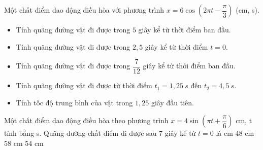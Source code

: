   \begin{vidu}
  	Một chất điểm dao động điều hòa với phương trình $x = 6\cos\left(2\pi t - \dfrac{\pi}{3}\right)$ (cm, s). 	
  	\begin{itemize}
  		\item[1.] Tính quãng đường vật đi được trong $5$ giây kể từ thời điểm ban đầu.
  		\item[2.] Tính quãng đường vật đi được trong $2,5$ giây kể từ thời điểm $t = 0$.
  		\item[3.] Tính quãng đường vật đi được trong $\dfrac{7}{12}$ giây kể từ thời điểm ban đầu.
  		\item[4.] Tính quãng đường vật đi được từ thời điểm $t_1 = 1,25\ s$ đến $t_2 = 4,5\ s$.
  		\item[5.] Tính tốc độ trung bình của vật trong $1,25$ giây đầu tiên.
  	\end{itemize}
  \end{vidu}
  \begin{vidu}%
  	Một chất điểm dao động điều hòa theo phương trình $x=4\sin \left({\pi t+\dfrac{\pi }{6}}\right)$ cm, t tính bằng s. Quãng đường chất điểm đi được sau 7 giây kể từ $t=0$ là
  	\choice
  	{ cm}
  	{48 cm}
  	{58 cm}
  	{54 cm}
  \end{vidu} %
